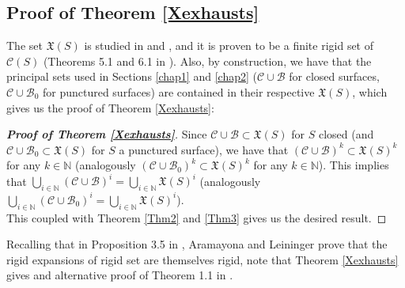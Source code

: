 \documentclass[twoside,11pt,a4paper]{article}
\newcommand*{\ccomp}[1]{\mathcal{C}(#1)}
\newcommand*{\nat}{\mathbb{N}}
\newcommand*{\X}{\mathfrak{X}}
\newcommand*{\Cf}{\mathscr{C}}
\newcommand*{\Bf}{\mathscr{B}}
\begin{document}
\subsection{Proof of Theorem \ref{Xexhausts}}\label{chap3sec2subsec3}
\indent The set $\X(S)$ is studied in \cite{Ara1} and \cite{Ara2}, and it is proven to be a finite rigid set of $\ccomp{S}$ (Theorems 5.1 and 6.1 in \cite{Ara1}). Also, by construction, we have that the principal sets used in Sections \ref{chap1} and \ref{chap2} ($\Cf \cup \Bf$ for closed surfaces, $\Cf \cup \Bf_{0}$ for punctured surfaces) are contained in their respective $\X(S)$, which gives us the proof of Theorem \ref{Xexhausts}:
\begin{proof}[\textbf{Proof of Theorem \ref{Xexhausts}}]
 Since $\Cf \cup \Bf \subset \X(S)$ for $S$ closed (and $\Cf \cup \Bf_{0} \subset \X(S)$ for $S$ a punctured surface), we have that $(\Cf \cup \Bf)^{k} \subset \X(S)^{k}$ for any $k \in \nat$ (analogously $(\Cf \cup \Bf_{0})^{k} \subset \X(S)^{k}$ for any $k \in \nat$). This implies that $\bigcup_{i \in \nat} (\Cf \cup \Bf)^{i} = \bigcup_{i \in \nat} \X(S)^{i}$ (analogously $\bigcup_{i \in \nat} (\Cf \cup \Bf_{0})^{i} = \bigcup_{i \in \nat} \X(S)^{i}$).\\
 \indent This coupled with Theorem \ref{Thm2} and \ref{Thm3} gives us the desired result.
\end{proof}
\indent Recalling that in Proposition 3.5 in \cite{Ara2}, Aramayona and Leininger prove that the rigid expansions of rigid set are themselves rigid, note that Theorem \ref{Xexhausts} gives and alternative proof of Theorem 1.1 in \cite{Ara2}.\\
\end{document}
